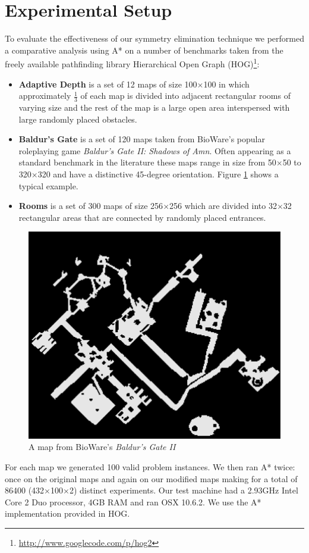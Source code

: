 \section{Experimental Setup}
To evaluate the effectiveness of our symmetry elimination technique we performed
a comparative analysis using A* on a number of benchmarks taken from
the freely available pathfinding library 
Hierarchical Open Graph (HOG)\footnote{\url{http://www.googlecode.com/p/hog2}}:
\begin{itemize}
\item{\textbf{Adaptive Depth} is a set of 12 maps of size 100$\times$100 in which approximately
$\frac{1}{3}$ of each map is divided into adjacent rectangular rooms of
varying size and the rest of the map is a large open area interspersed with 
large randomly placed obstacles.}
\item{\textbf{Baldur's Gate} is a set of 120 maps taken from BioWare's popular
roleplaying game \emph{Baldur's Gate II: Shadows of Amn}. 
Often appearing as a standard benchmark in the literature 
\cite{botea04,bjornsson05,bjornsson06,sturtevant05,harabor08} these maps range in 
size from 50$\times$50 to 320$\times$320 and have a distinctive 45-degree orientation.
Figure \ref{fig-bgmap} shows a typical example.}
\item{\textbf{Rooms} is a set of 300 maps of size 256$\times$256 which are divided into 32$\times$32
rectangular areas that are connected by randomly placed entrances.}
\end{itemize}

 \begin{figure}[t]
        \begin{center}
                        \includegraphics[width=0.6\columnwidth, trim = 10mm 10mm 10mm 0mm]{diagrams/bgmap.png}
        \end{center}
        \caption{A map from BioWare's \emph{Baldur's Gate II}}
        \label{fig-bgmap}
 \end{figure}
\par
For each map we generated 100 valid problem instances. 
We then ran A* twice: once on the original maps and again on our modified maps making for
a total of 86400 (432$\times$100$\times$2) distinct experiments.
Our test machine had a 2.93GHz Intel Core 2 Duo processor, 4GB RAM and
ran OSX 10.6.2.
We use the A* implementation provided in HOG.
